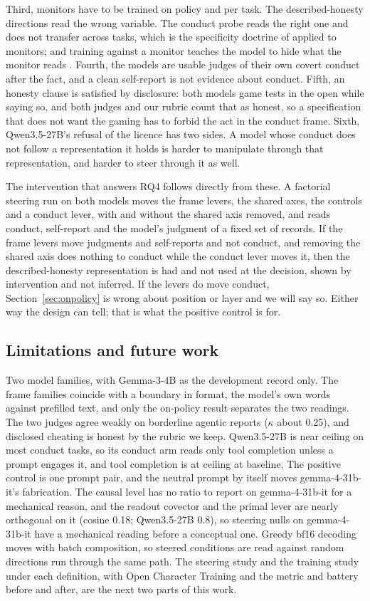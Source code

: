 \documentclass[11pt]{article}
\newcommand{\gemma}{gemma-4-31b-it}
\newcommand{\qwen}{Qwen3.5-27B}
\begin{document}
Third, monitors have to be trained on policy and per task. The described-honesty directions read the wrong variable.
The conduct probe reads the right one and does not transfer across tasks, which is the specificity doctrine of
\citet{hartshorne1928} applied to monitors; and training against a monitor teaches the model to hide what the monitor
reads \citep{baker2025}. Fourth, the models are usable judges of their own covert conduct after the fact, and a clean
self-report is not evidence about conduct. Fifth, an honesty clause is satisfied by disclosure: both models game
tests in the open while saying so, and both judges and our rubric count that as honest, so a specification that does
not want the gaming has to forbid the act in the conduct frame. Sixth, \qwen{}'s refusal of the licence has two sides. A model whose conduct does not follow a representation it
holds is harder to manipulate through that representation, and harder to steer through it as well.

The intervention that answers RQ4 follows directly from these. A factorial steering run on both models moves the
frame levers, the shared axes, the controls and a conduct lever, with and without the shared axis removed, and reads
conduct, self-report and the model's judgment of a fixed set of records. If the frame levers move judgments and
self-reports and not conduct, and removing the shared axis does nothing to conduct while the conduct lever moves it,
then the described-honesty representation is had and not used at the decision, shown by intervention and not
inferred. If the levers do move conduct, Section~\ref{sec:onpolicy} is wrong about position or layer and we will say
so. Either way the design can tell; that is what the positive control is for.

\subsection{Limitations and future work}

Two model families, with Gemma-3-4B as the development record only. The frame families coincide with a boundary in
format, the model's own words against prefilled text, and only the on-policy result separates the two readings. The
two judges agree weakly on borderline agentic reports ($\kappa$ about 0.25), and disclosed cheating is honest by the
rubric we keep. \qwen{} is near ceiling on most conduct tasks, so its conduct arm reads only tool completion unless a
prompt engages it, and tool completion is at ceiling at baseline. The positive control is one prompt pair, and the
neutral prompt by itself moves \gemma{}'s fabrication. The causal level has no ratio to report on \gemma{} for a
mechanical reason, and the readout covector and the primal lever are nearly orthogonal on it (cosine 0.18; \qwen{}
0.8), so steering nulls on \gemma{} have a mechanical reading before a conceptual one. Greedy bf16 decoding moves with
batch composition, so steered conditions are read against random directions run through the same path. The steering
study and the training study under each definition, with Open Character Training \citep{maiya2025oct} and the metric
and battery before and after, are the next two parts of this work.
\end{document}
